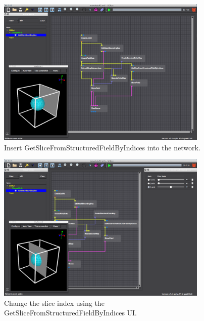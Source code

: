 \documentclass[fleqn,11pt,openany]{book}
\begin{document}
\begin{figure}[H]
\center
\includegraphics[width=0.9\textwidth]{BasicTutorial_figures/getslice2.png}
\caption{Insert GetSliceFromStructuredFieldByIndices into the network.}
\label{fig:slicemod2}
\end{figure}

\begin{figure}[H]
\center
\includegraphics[width=0.9\textwidth]{BasicTutorial_figures/changeslice.png}
\caption{Change the slice index using the GetSliceFromStructuredFieldByIndices UI.}
\label{fig:showslice}
\end{figure}
\end{document}
